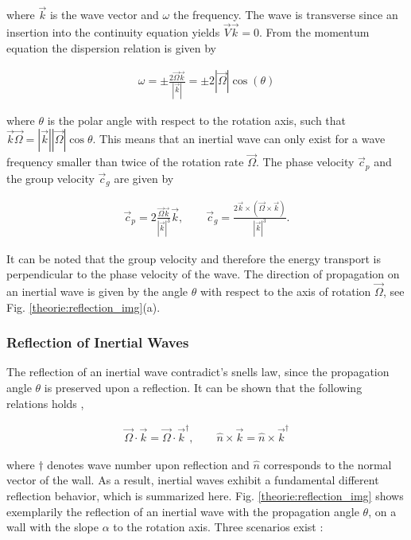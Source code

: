 where $\vec{k}$ is the wave vector and $\omega$ the frequency.
The wave is transverse since an insertion into the continuity equation yields $\vec{V}\vec{k} = 0$.
From the momentum equation the dispersion relation is given by

\begin{align}
    \label{theorie:eq_rot_dispersion}
    \omega = \pm \frac{ 2\vec{\Omega}\vec{k}}{|\vec{k}|} = \pm 2|\vec{\Omega}|\cos(\theta)
\end{align}

where $\theta$ is the polar angle with respect to the rotation axis,
such that $\vec{k}\vec{\Omega} = |\vec{k}||\vec{\Omega}|\cos{\theta}$.
This means that an inertial wave can only exist for a wave frequency smaller than twice of the rotation rate $\vec{\Omega}$.
The phase velocity $\vec{c}_p$ and the group velocity $\vec{c}_g$ are given by

\begin{align}
    \vec{c}_p = 2 \frac{\vec{\Omega} \vec{k} }{|\vec{k}|^3} \vec{k}, \qquad
    \vec{c}_g = \frac{2 \vec{k} \times (\vec{\Omega} \times \vec{k})}{|\vec{k}|^3}.
\end{align}

\clearpage


It can be noted that the group velocity and therefore the energy transport is perpendicular to the phase velocity of the wave.
The direction of propagation on an inertial wave is given by the angle $\theta$ with respect to the axis of rotation $\vec{\Omega}$,
see Fig. \ref{theorie:reflection_img}(a).


\subsubsection{Reflection of Inertial Waves}
\label{theorie:sec:iwreflec}

The reflection of an inertial wave contradict's snells law, since the propagation angle $\theta$ is preserved upon a reflection.
It can be shown that the following relations holds \cite{Beardsley1970},

\begin{align}
\label{theorie:reflections}
\vec{\Omega}\cdot \vec{k} =  \vec{\Omega}\cdot\vec{k}^\dagger, \qquad \hat{n} \times \vec{k} = \hat{n} \times \vec{k}^\dagger
\end{align}

where $\dagger$ denotes wave number upon reflection and $\hat{n}$ corresponds to the normal vector of the wall.
As a result, inertial waves exhibit a fundamental different reflection behavior, which is summarized here.
Fig. \ref{theorie:reflection_img} shows exemplarily the reflection of an inertial wave with the propagation angle $\theta$,
on a wall with the slope $\alpha$ to the rotation axis. Three scenarios exist \citep{Clausen2011}:

